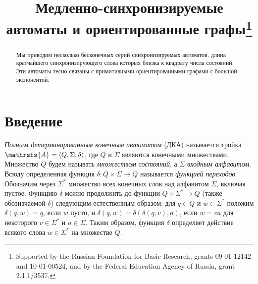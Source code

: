 \documentclass[11pt]{article}
\newcommand{\sa}{synchronizing automata}
\begin{document}
\title{Медленно-синхронизируемые автоматы и ориентированные графы\thanks{Supported
by the Russian Foundation for Basic Research, grants 09-01-12142
and 10-01-00524, and by the Federal Education Agency of Russia,
grant 2.1.1/3537.}}






\maketitle


\begin{abstract}
Мы приводим несколько бесконечных серий синхронизируемых автоматов, 
длина кратчайшего синхронизирующего слова которых близка к квадрату числа состояний.
Эти автоматы тесно связаны с примитивными ориентированными графами
с большой экспонентой.
\end{abstract}


%



\section{Введение}
\label{intro}

\emph{Полным детерминированным конечным автоматом} (ДКА) называется
тройка $\mathrsfs{A}=\langle Q,\Sigma,\delta\rangle$, где $Q$ и
$\Sigma$ являются конечными множествами. Множество $Q$ будем называть \emph{множеством состояний},
а $\Sigma$ \emph{входным алфавитом}. Всюду определенная функция $\delta:Q\times\Sigma\to Q$ 
называется \emph{функцией переходов}. 
Обозначим через $\Sigma^*$ множество всех конечных слов над
алфавитом $\Sigma$, включая пустое.
Функцию $\delta$ можно продолжить до функции $Q\times\Sigma^*\to Q$
(также обозначаемой $\delta$) следующим естественным образом: для
$q\in Q$ и $w\in\Sigma^*$ положим $\delta(q,w)=q$, если $w$ пусто, и 
$\delta(q,w)=\delta(\delta(q,v),a)$, если $w=va$ для некоторого $v\in\Sigma^*$
и $a\in\Sigma$. Таким образом, функция $\delta$ определяет действие всякого слова $w\in\Sigma^*$
на множестве $Q$.
\end{document}
